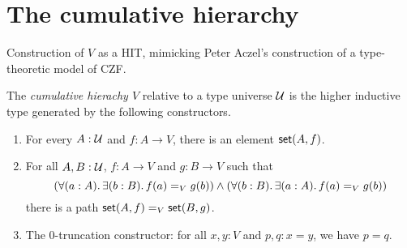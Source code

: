 %
%

\section{The cumulative hierarchy}
\label{sec:cumulative-hierarchy}

Construction of $V$ as a HIT, mimicking Peter Aczel's construction of a type-theoretic
model of CZF.

\begin{defn}
  The \emph{cumulative hierachy $V$} relative to a type universe $\UU$ is the
  higher inductive type generated by the following constructors.
  \begin{enumerate}
  \item For every $A : \UU$ and $f : A \to V$, there is an element $\vset(A, f)$.
  \item For all $A, B : \UU$, $f : A \to V$ and $g : B \to V$ such that
    \begin{equation} \label{eq:V-path}
      (\fall{a:A} \exis{b:B} \id[V]{f(a)}{g(b)}) \land (\fall{b:B} \exis{a:A} \id[V]{f(a)}{g(b)})
    \end{equation}
    there is a path $\id[V]{\vset(A,f)}{\vset(B,g)}$.
  \item The 0-truncation constructor: for all $x,y:V$ and $p,q:x=y$, we have $p=q$.
  \end{enumerate}
\end{defn}

